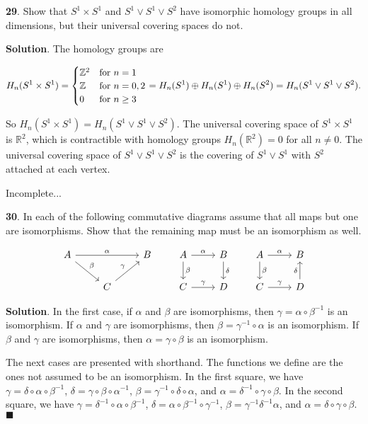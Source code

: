 \documentclass{article}
\newcommand{\R}{\mathbb{R}}
\newcommand{\Z}{\mathbb{Z}}
\begin{document}
\textbf{29}. Show that $S^{1}\times S^{1}$ and $S^{1}\vee S^{1}\vee S^{2}$ have isomorphic homology groups in all dimensions, but their universal covering spaces do not.
\medskip

\textbf{Solution}. The homology groups are

\[H_{n}(S^{1}\times S^{1}) = \begin{cases} \Z^{2} & \textnormal{for } n=1\\ \Z & \textnormal{for } n = 0, 2\\
0 & \textnormal{for } n\geq3 \end{cases} = H_{n}(S^{1})\oplus H_{n}(S^{1})\oplus H_{n}(S^{2}) = H_{n}(S^{1}\vee S^{1}\vee S^{2}).\]

So $H_{n}(S^{1}\times S^{1}) = H_{n}(S^{1}\vee S^{1}\vee S^{2})$. The universal covering space of $S^{1}\times S^{1}$ is $\R^{2}$, which is contractible with homology groups $H_{n}(\R^{2}) = 0$ for all $n\neq 0$. The universal covering space of $S^{1}\vee S^{1}\vee S^{2}$ is the covering of $S^{1}\vee S^{1}$ with $S^{2}$ attached at each vertex.
\medskip

Incomplete...
\bigskip
\bigskip

\textbf{30}. In each of the following commutative diagrams assume that all maps but one are isomorphisms. Show that the remaining map must be an isomorphism as well.

\[\begin{tikzcd}
A \arrow{rr}{\alpha}\arrow{dr}{\beta} & & B\\
& C\arrow{ur}{\gamma} &
\end{tikzcd}\quad\quad \begin{tikzcd}
A \arrow{r}{\alpha}\arrow{d}{\beta} & B \arrow{d}{\delta}\\
C\arrow{r}{\gamma} & D
\end{tikzcd}\quad\quad \begin{tikzcd}
A \arrow{r}{\alpha}\arrow{d}{\beta} & B\\
C\arrow{r}{\gamma} & D \arrow{u}{\delta}
\end{tikzcd}\]
\medskip
    
\textbf{Solution}. In the first case, if $\alpha$ and $\beta$ are isomorphisms, then $\gamma = \alpha\circ \beta^{-1}$ is an isomorphism. If $\alpha$ and $\gamma$ are isomorphisms, then $\beta = \gamma^{-1}\circ \alpha$ is an isomorphism. If $\beta$ and $\gamma$ are isomorphisms, then $\alpha = \gamma\circ \beta$ is an isomorphism.
\medskip

The next cases are presented with shorthand. The functions we define are the ones not assumed to be an isomorphism. In the first square, we have $\gamma = \delta\circ \alpha\circ \beta^{-1}$, $\delta = \gamma\circ \beta\circ \alpha^{-1}$, $\beta = \gamma^{-1}\circ \delta\circ \alpha$, and $\alpha = \delta^{-1}\circ \gamma\circ \beta$. In the second square, we have $\gamma = \delta^{-1}\circ \alpha\circ \beta^{-1}$, $\delta = \alpha\circ \beta^{-1}\circ \gamma^{-1}$, $\beta = \gamma^{-1}\delta^{-1}\alpha$, and $\alpha = \delta\circ \gamma\circ \beta$. $\blacksquare$
\medskip
\end{document}

